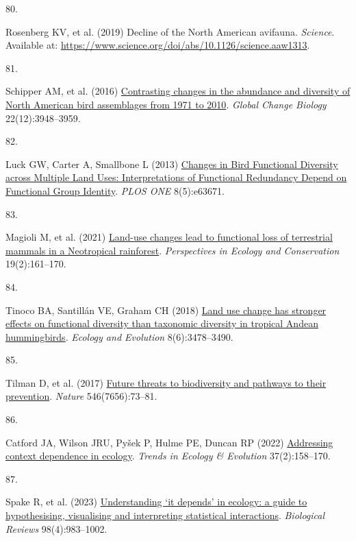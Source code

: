 \documentclass{article}
\newlength{\cslhangindent}
\newlength{\csllabelwidth}
\newlength{\cslentryspacingunit} %
\newenvironment{CSLReferences}[2] %
 {%
  \setlength{\parindent}{0pt}
  \ifodd #1
  \let\oldpar\par
  \def\par{\hangindent=\cslhangindent\oldpar}
  \fi
  \setlength{\parskip}{#2\cslentryspacingunit}
 }%
 {}
\newcommand{\CSLLeftMargin}[1]{\parbox[t]{\csllabelwidth}{#1}}
\newcommand{\CSLRightInline}[1]{\parbox[t]{\linewidth - \csllabelwidth}{#1}\break}
\begin{document}
\begin{CSLReferences}{0}{0}
\leavevmode{}%
\CSLLeftMargin{80. }%
\CSLRightInline{Rosenberg KV, et al. (2019) Decline of the North
American avifauna. \emph{Science}. Available at:
\url{https://www.science.org/doi/abs/10.1126/science.aaw1313}.}

\leavevmode{}%
\CSLLeftMargin{81. }%
\CSLRightInline{Schipper AM, et al. (2016)
\href{https://doi.org/10.1111/gcb.13292}{Contrasting changes in the
abundance and diversity of North American bird assemblages from 1971 to
2010}. \emph{Global Change Biology} 22(12):3948--3959.}

\leavevmode{}%
\CSLLeftMargin{82. }%
\CSLRightInline{Luck GW, Carter A, Smallbone L (2013)
\href{https://doi.org/10.1371/journal.pone.0063671}{Changes in Bird
Functional Diversity across Multiple Land Uses: Interpretations of
Functional Redundancy Depend on Functional Group Identity}. \emph{PLOS
ONE} 8(5):e63671.}

\leavevmode{}%
\CSLLeftMargin{83. }%
\CSLRightInline{Magioli M, et al. (2021)
\href{https://doi.org/10.1016/j.pecon.2021.02.006}{Land-use changes lead
to functional loss of terrestrial mammals in a Neotropical rainforest}.
\emph{Perspectives in Ecology and Conservation} 19(2):161--170.}

\leavevmode{}%
\CSLLeftMargin{84. }%
\CSLRightInline{Tinoco BA, Santillán VE, Graham CH (2018)
\href{https://doi.org/10.1002/ece3.3813}{Land use change has stronger
effects on functional diversity than taxonomic diversity in tropical
Andean hummingbirds}. \emph{Ecology and Evolution} 8(6):3478--3490.}

\leavevmode{}%
\CSLLeftMargin{85. }%
\CSLRightInline{Tilman D, et al. (2017)
\href{https://doi.org/10.1038/nature22900}{Future threats to
biodiversity and pathways to their prevention}. \emph{Nature}
546(7656):73--81.}

\leavevmode{}%
\CSLLeftMargin{86. }%
\CSLRightInline{Catford JA, Wilson JRU, Pyšek P, Hulme PE, Duncan RP
(2022) \href{https://doi.org/10.1016/j.tree.2021.09.007}{Addressing
context dependence in ecology}. \emph{Trends in Ecology \& Evolution}
37(2):158--170.}

\leavevmode{}%
\CSLLeftMargin{87. }%
\CSLRightInline{Spake R, et al. (2023)
\href{https://doi.org/10.1111/brv.12939}{Understanding {`}it depends{'}
in ecology: a guide to hypothesising, visualising and interpreting
statistical interactions}. \emph{Biological Reviews} 98(4):983--1002.}


\end{CSLReferences}
\end{document}

